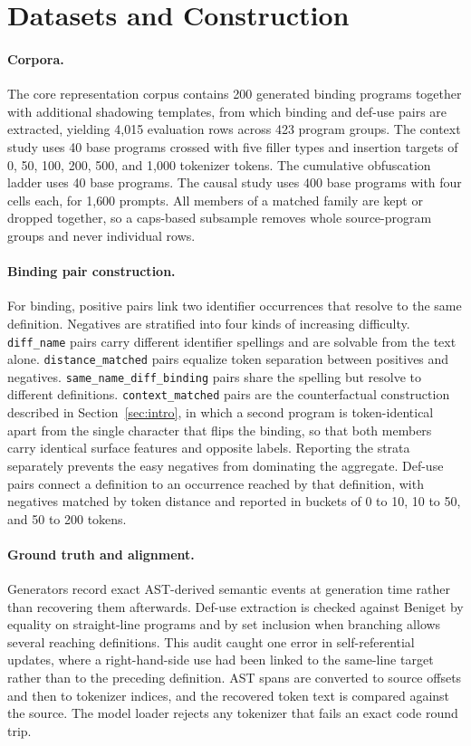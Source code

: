 \documentclass{article}
\begin{document}
\clearpage
\appendix

\section{Datasets and Construction}
\label{app:data}

\paragraph{Corpora.}
The core representation corpus contains 200 generated binding programs together with additional shadowing templates, from which binding and def-use pairs are extracted, yielding 4{,}015 evaluation rows across 423 program groups. The context study uses 40 base programs crossed with five filler types and insertion targets of 0, 50, 100, 200, 500, and 1{,}000 tokenizer tokens. The cumulative obfuscation ladder uses 40 base programs. The causal study uses 400 base programs with four cells each, for 1{,}600 prompts. All members of a matched family are kept or dropped together, so a caps-based subsample removes whole source-program groups and never individual rows.

\paragraph{Binding pair construction.}
For binding, positive pairs link two identifier occurrences that resolve to the same definition. Negatives are stratified into four kinds of increasing difficulty. \texttt{diff\_name} pairs carry different identifier spellings and are solvable from the text alone. \texttt{distance\_matched} pairs equalize token separation between positives and negatives. \texttt{same\_name\_diff\_binding} pairs share the spelling but resolve to different definitions. \texttt{context\_matched} pairs are the counterfactual construction described in Section~\ref{sec:intro}, in which a second program is token-identical apart from the single character that flips the binding, so that both members carry identical surface features and opposite labels. Reporting the strata separately prevents the easy negatives from dominating the aggregate. Def-use pairs connect a definition to an occurrence reached by that definition, with negatives matched by token distance and reported in buckets of 0 to 10, 10 to 50, and 50 to 200 tokens.

\paragraph{Ground truth and alignment.}
Generators record exact AST-derived semantic events at generation time rather than recovering them afterwards. Def-use extraction is checked against Beniget by equality on straight-line programs and by set inclusion when branching allows several reaching definitions. This audit caught one error in self-referential updates, where a right-hand-side use had been linked to the same-line target rather than to the preceding definition. AST spans are converted to source offsets and then to tokenizer indices, and the recovered token text is compared against the source. The model loader rejects any tokenizer that fails an exact code round trip.
\end{document}
